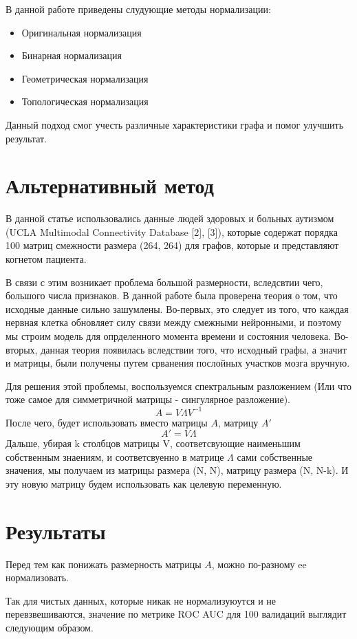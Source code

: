 \documentclass{urticle}
\begin{document}
В данной работе приведены слудующие методы нормализации:
\begin{itemize}
	\item Оригинальная нормализация
	\item Бинарная нормализация
	\item Геометрическая нормализация
	\item Топологическая нормализация			
\end{itemize}

Данный подход смог учесть различные характеристики графа и помог улучшить результат.

\section*{Альтернативный метод}
В данной статье использовались данные людей здоровых и больных аутизмом (UCLA Multimodal Connectivity Database [2], [3]), которые содержат порядка 100 матриц смежности размера (264, 264) для графов, которые и представляют когнетом пациента.

В связи с этим возникает проблема большой размерности, вследсвтии чего, большого числа признаков. В данной работе была проверена теория о том, что исходные данные сильно зашумлены. Во-первых, это следует из того, что каждая нервная клетка обновляет силу связи между смежными нейронными, и поэтому мы строим модель для опрделенного момента времени и состояния человека. Во-вторых, данная теория появилась вследствии того, что исходный графы, а значит и матрицы, были получены путем срванения послойных участков мозга вручную.

Для решения этой проблемы, воспользуемся спектральным разложением (Или что тоже самое для симметричной матрицы - сингулярное разложение). 
$$ A = V \Lambda {V}^{-1} $$
После чего, будет использовать вместо матрицы $A$, матрицу $A'$
$$ A' = V \Lambda $$
Дальше, убирая k столбцов матрицы V, соответсвующие наименьшим собственным знаениям, и соответсвуенно в матрице $\Lambda$ сами собственные значения, мы получаем из матрицы размера (N, N), матрицу размера (N, N-k). И эту новую матрицу будем использовать как целевую переменную.

\section*{Результаты}
Перед тем как понижать размерность матрицы $A$, можно по-разному ee нормализовать.

Так для чистых данных, которые никак не нормализуюутся и не перевзвешиваются, значение по метрике ROC AUC для 100 валидаций выглядит следующим образом.
\end{document}

